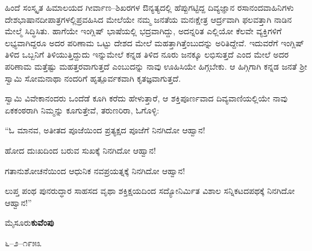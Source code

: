 \vskip 2pt

ಹಿಂದೆ ಸಂಸ್ಕೃತ ಹಿಮಾಲಯದ ಗೀರ್ವಾಣ–ಶಿಖರಗಳ ಔನ್ಯತ್ಯದಲ್ಲಿ ಹೆಪ್ಪುಗಟ್ಟಿದ್ದ ದಿವ್ಯಜ್ಞಾನ ರಸಾನಂದವಾಹಿನಿಗಳು ದೇಶಭಾಷಾನದೀಪಾತ್ರಗಳಲ್ಲಿ\break ಪ್ರವಹಿಸಿದ ಮೇಲೆಯೇ ನಮ್ಮ ಜನತೆಯ ಮನಃಕ್ಷೇತ್ರ ಆರ್ದ್ರವಾಗಿ ಫಲವತ್ತಾಗಿ ನಾಡಿನ ಮೇಲ್ಮೆ ಸಿದ್ಧಿಸಿತು. ಹಾಗೆಯೇ ಇಂಗ್ಲಿಷ್​ ಭಾಷೆಯಲ್ಲಿ ಭದ್ರವಾಗಿದ್ದು, ಅದನ್ನರಿತ ಎಲ್ಲಿಯೋ ಕೆಲವೇ ವ್ಯಕ್ತಿಗಳಿಗೆ ಲಭ್ಯವಾಗಿದ್ದರೂ ಅದರ ಪರಿಣಾಮ ಒಟ್ಟು ದೇಶದ ಮೇಲೆ ಮಹತ್ತಾಗಿತ್ತೆಂಬುದನ್ನು ಅರಿತಿದ್ದೇವೆ. ಇದುವರೆಗೆ ಇಂಗ್ಲಿಷ್​ ತಿಳಿದ ಒಬ್ಬನಿಗೆ ತಿಳಿಯುತ್ತಿದ್ದುದು ಇನ್ನುಮೇಲೆ ಕನ್ನಡ ತಿಳಿದ ನೂರು ಜನಕ್ಕೂ ಲಭಿಸುತ್ತದೆ ಎಂದ ಮೇಲೆ ಅದರ ಪರಿಣಾಮ ಮತ್ತೆಷ್ಟು ಮಹತ್ತರವಾಗುತ್ತದೆ ಎಂಬುದನ್ನು ನಾವು ಊಹಿಸಿಯೇ ಹಿಗ್ಗಬೇಕು. ಆ ಹಿಗ್ಗಿಗಾಗಿ ಕನ್ನಡ ಜನತೆ ಶ‍್ರೀ ಸ್ವಾಮಿ ಸೋಮನಾಥಾ ನಂದರಿಗೆ ಹೃತ್ಪೂರ್ವಕವಾಗಿ ಕೃತಜ್ಞವಾಗುತ್ತದೆ.

\vskip 2pt

ಸ್ವಾಮಿ ವಿವೇಕಾನಂದರು ಒಂದೆಡೆ ಕೂಗಿ ಕರೆದು ಹೇಳುತ್ತಾರೆ, ಆ ಶಕ್ತಿಪೂರ್ಣವಾದ ದಿವ್ಯವಾಣಿಯಲ್ಲಿಯೇ ನಾವು ಏಕಕಂಠರಾಗಿ ನಿಮ್ಮನ್ನು ಕೂಗುತ್ತೇವೆ, ತರುಣರಿರಾ, ಓಗೊಳ್ಳಿ:

\vskip 2pt

“ಓ ಮಾನವ, ಅತೀತದ ಪೂಜೆಯಿಂದ ಪ್ರತ್ಯಕ್ಷದ ಪೂಜೆಗೆ ನಿನಗಿದೋ ಆಹ್ವಾನ!

\vskip 2pt

ಹೋದ ದುಃಖದಿಂದ ಬರುವ ಸುಖಕ್ಕೆ ನಿನಗಿದೋ ಆಹ್ವಾನ!

\vskip 2pt

ಗತಾನುಶೋಚನೆಯಿಂದ ಆಧುನಿಕ ನವಪ್ರಯತ್ನಕ್ಕೆ ನಿನಗಿದೋ ಆಹ್ವಾನ!

\newpage

ಲುಪ್ತ ಪಂಥ ಪುನರುದ್ಧಾರ ಸಾಹಸದ ವೃಥಾ ಶಕ್ತಿಕ್ಷಯದಿಂದ ಸದ್ಯೋನಿರ್ಮಿತ ವಿಶಾಲ ಸನ್ನಿಕಟದಪಥಕ್ಕೆ ನಿನಗಿದೋ ಆಹ್ವಾನ!”

\bigskip

\noindent
ಮೈಸೂರು\hfill \textbf{ಕುವೆಂಪು}

\noindent
೬–೨–೧೯೫೩

